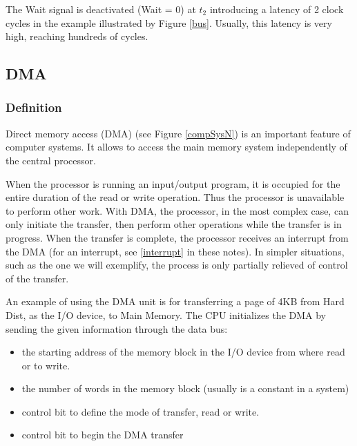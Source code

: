 The Wait signal is deactivated (Wait = 0) at $t_2$ introducing a latency of 2 clock cycles in the example illustrated by Figure \ref{bus}. Usually, this latency is very high, reaching hundreds of cycles.



\subsection{DMA}

\subsubsection{Definition}

Direct memory access (DMA) (see Figure \ref{compSysN}) is an important feature of computer systems. It allows  to access the main memory  system independently of the central processor.

When the processor is running an input/output program, it is occupied for the entire duration of the read or write operation. Thus the processor is unavailable to perform other work. With DMA, the processor, in the most complex case, can only initiate the transfer, then perform other operations while the transfer is in progress. When the transfer is complete, the processor receives an interrupt from the DMA (for an interrupt, see \ref{interrupt} in these notes). In simpler situations, such as the one we will exemplify, the process is only partially relieved of control of the transfer.

An example of using the DMA unit is for transferring a page of 4KB from Hard Dist, as the I/O device, to Main Memory.
The CPU initializes the DMA by sending the given information through the data bus:
\begin{itemize}
    \item the starting address of the memory block in the I/O device from where read or to write.
    \item the number of words in the memory block (usually is a constant in a system)
    \item control bit to define the mode of transfer, read or write.
    \item control bit to begin the DMA transfer
\end{itemize}

